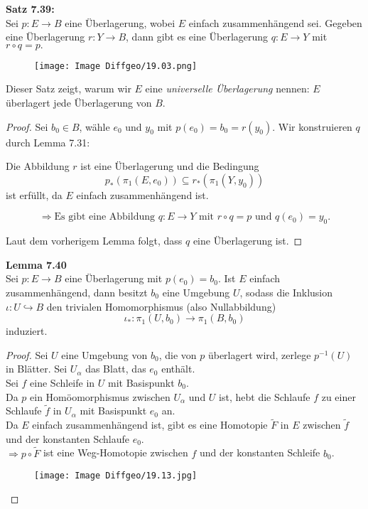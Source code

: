 \documentclass[fleqn, 12pt, letterpaper]{article}
\begin{document}
\textbf{Satz 7.39:} \\
Sei \( p : E \to B \) eine Überlagerung, wobei \( E \) einfach zusammenhängend sei. Gegeben eine Überlagerung \( r : Y \to B \), dann gibt es eine Überlagerung \( q : E \to Y \) mit
\(
r \circ q = p.
\)
  \begin{figure}[H]
    \centering
    \texttt{[image: Image Diffgeo/19.03.png]}
 \end{figure}
Dieser Satz zeigt, warum wir \( E \) eine \emph{universelle Überlagerung} nennen: \( E \) überlagert jede Überlagerung von \( B \).

\begin{proof}
Sei \( b_0 \in B \), wähle \( e_0 \) und \( y_0 \) mit \( p(e_0) = b_0 = r(y_0) \).  
Wir konstruieren \( q \) durch Lemma 7.31:

Die Abbildung \( r \) ist eine Überlagerung und die Bedingung  
\[
p_* \left( \pi_1(E, e_0) \right) \subseteq r_* \left( \pi_1(Y, y_0) \right)
\]  
ist erfüllt, da \( E \) einfach zusammenhängend ist.

\[
\Rightarrow \text{Es gibt eine Abbildung } q : E \to Y \text{ mit } r \circ q = p \text{ und } q(e_0) = y_0.
\]

Laut dem vorherigem Lemma folgt, dass \( q \) eine Überlagerung ist. 
\end{proof}

\textbf{Lemma 7.40} \\
Sei \( p : E \to B \) eine Überlagerung mit \( p(e_0) = b_0 \). Ist \( E \) einfach zusammenhängend, dann besitzt \( b_0 \) eine Umgebung \( U \), sodass die Inklusion \( \iota : U \hookrightarrow B \) den trivialen Homomorphismus (also Nullabbildung)
\[
\iota_* : \pi_1(U, b_0) \longrightarrow \pi_1(B, b_0)
\]
induziert.

\begin{proof}
Sei \( U \) eine Umgebung von \( b_0 \), die von \( p \) überlagert wird, zerlege $p^{-1}(U)$ in Blätter. Sei \( U_\alpha \) das Blatt, das \( e_0 \) enthält. \\

Sei \( f \) eine Schleife in \( U \) mit Basispunkt \( b_0 \). \\
Da \( p \) ein Homöomorphismus zwischen \( U_\alpha \) und \( U \) ist, hebt die Schlaufe \( f \) zu einer Schlaufe \( \tilde{f} \) in \({U_\alpha} \) mit Basispunkt \( e_0 \) an. \\

Da \( E \) einfach zusammenhängend ist, gibt es eine Homotopie \( \tilde{F} \) in \( E \) zwischen \( \tilde{f} \) und der konstanten Schlaufe $e_0$. \\
\(\Rightarrow p\circ\tilde{F} \) ist eine Weg-Homotopie zwischen \( f \) und der konstanten Schleife $b_0$.
  \begin{figure}[H]
    \centering
    \texttt{[image: Image Diffgeo/19.13.jpg]}
 \end{figure}
\end{proof}
\end{document}

